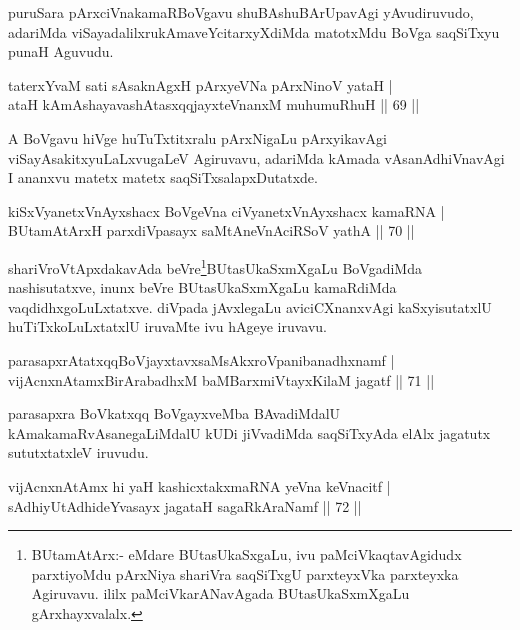 \begin{artha}
puruSara pArxciVnakamaRBoVgavu shuBAshuBArUpavAgi yAvudiruvudo, adariMda viSayadalilxrukAmaveYcitarxyXdiMda matotxMdu BoVga saqSiTxyu punaH Aguvudu.
\end{artha}

\begin{shl}
taterxYvaM sati sAsaknAgxH pArxyeVNa pArxNinoV yataH |\\
ataH kAmAshayavashAtasxqqjayxteV\s nanxM muhumuRhuH \hfill || 69 ||
\end{shl}

\begin{artha}
A BoVgavu hiVge huTuTxtitxralu pArxNigaLu pArxyikavAgi viSayAsakitxyuLaLxvugaLeV Agiruvavu, adariMda kAmada vAsanAdhiVnavAgi I ananxvu matetx matetx saqSiTxsalapxDutatxde.
\end{artha}

\begin{shl}
kiSxVyanetxV\s nAyxshacx BoVgeVna ciVyanetxV\s nAyxshacx kamaRNA |\\
BUtamAtArxH parxdiVpasayx saMtAneVnAciRSoV yathA \hfill || 70 ||
\end{shl}

\begin{artha}
shariVroVtApxdakavAda beVre\footnote{BUtamAtArx:- eMdare BUtasUkaSxgaLu, ivu paMciVkaqtavAgidudx parxtiyoMdu pArxNiya shariVra saqSiTxgU parxteyxVka parxteyxka Agiruvavu. ililx  paMciVkarANavAgada BUtasUkaSxmXgaLu gArxhayxvalalx.}BUtasUkaSxmXgaLu BoVgadiMda nashisutatxve, inunx beVre BUtasUkaSxmXgaLu kamaRdiMda vaqdidhxgoLuLxtatxve. diVpada jAvxlegaLu aviciCXnanxvAgi kaSxyisutatxlU huTiTxkoLuLxtatxlU iruvaMte ivu hAgeye iruvavu.
\end{artha}

\begin{shl}
parasapxrAtatxqqBoVjayxtavxsaMsAkxroVpanibanadhxnamf |\\
vijAcnxnAtamxBirArabadhxM baMBarxmiVtayxKilaM jagatf \hfill || 71 ||
\end{shl}

\begin{artha}
parasapxra BoVkatxqq BoVgayxveMba BAvadiMdalU kAmakamaRvAsanegaLiMdalU kUDi jiVvadiMda saqSiTxyAda elAlx jagatutx sututxtatxleV iruvudu.
\end{artha}


\begin{shl}
vijAcnxnAtAmx hi yaH kashicxtakxmaRNA yeVna keVnacitf |\\
sAdhiyUtAdhideYvasayx jagataH sagaRkAraNamf \hfill || 72 ||
\end{shl}

